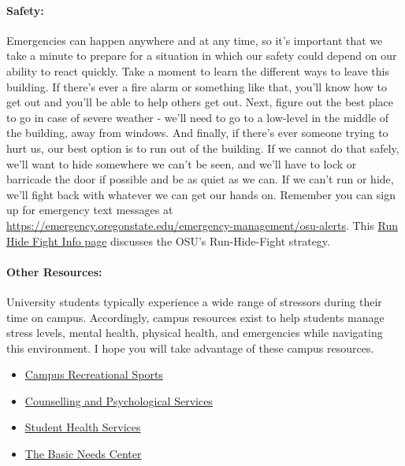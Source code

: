 \documentclass[11pt, a4paper]{article}
\begin{document}
\paragraph{Safety:}
Emergencies can happen anywhere and at any time, so it’s important that we take
a minute to prepare for a situation in which our safety could depend on our
ability to react quickly. Take a moment to learn the different ways to leave
this building. If there's ever a fire alarm or something like that, you’ll know
how to get out and you'll be able to help others get out. Next, figure out the
best place to go in case of severe weather - we'll need to go to a low-level in
the middle of the building, away from windows. And finally, if there's ever
someone trying to hurt us, our best option is to run out of the building. If we
cannot do that safely, we'll want to hide somewhere we can't be seen, and we'll
have to lock or barricade the door if possible and be as quiet as we can. 
If we can't run or hide, we'll fight back with whatever we can
get our hands on. 
Remember you can sign up for
emergency text messages at \url{https://emergency.oregonstate.edu/emergency-management/osu-alerts}. This
\href{https://emergency.oregonstate.edu/emergency-preparedness/emergency-procedures/run-hide-fight-info}{Run Hide Fight Info page}
discusses the OSU's Run-Hide-Fight strategy.


\paragraph{Other Resources:}
University students typically experience a wide range of stressors during their
time on campus. Accordingly, campus resources exist to help students manage
stress levels, mental health, physical health, and emergencies while navigating
this environment. I hope you will take advantage of these campus resources.

\begin{itemize}
\item \href{https://recsports.oregonstate.edu/}{Campus Recreational Sports}
\item \href{https://counseling.oregonstate.edu/}{Counselling and Psychological Services}
\item \href{https://studenthealth.oregonstate.edu/}{Student Health Services}
\item \href{https://studentlife.oregonstate.edu/bnc}{The Basic Needs Center}
\end{itemize}
\end{document}
